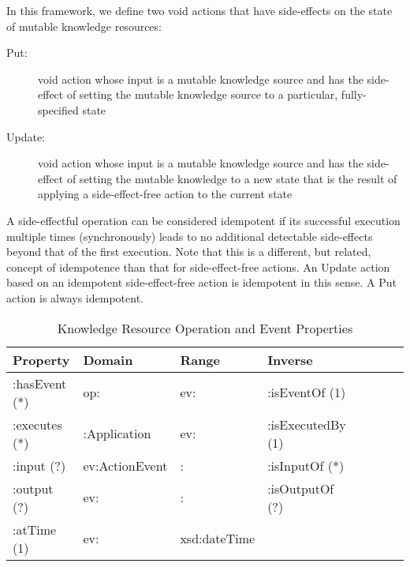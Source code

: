 \documentclass[runningheads]{llncs}
\begin{document}
In this framework, we define two void actions that have side-effects on the state of mutable knowledge resources:
  \begin{description}
    \item[Put:] void action whose input is a mutable knowledge source and has the side-effect of setting the mutable knowledge source to a particular, fully-specified state
    \item[Update:] void action whose input is a mutable knowledge source and has the side-effect of setting the mutable knowledge to a new state that is the result of applying a side-effect-free action to the current state
  \end{description}
  
  A side-effectful operation can be considered idempotent if its successful execution multiple times (synchronously) leads to no additional detectable side-effects beyond that of the first execution. Note that this is a different, but related, concept of idempotence than that for side-effect-free actions. An Update action based on an idempotent side-effect-free action is idempotent in this sense. A Put action is always idempotent.

\begin{table}[h]
\begin{tabular}{|l|l|l|l|l|l|l|l|}
\hline
\textbf{Property}  &\textbf{Domain}  & \textbf{Range}  & \textbf{Inverse}
\\ \hline
:hasEvent (*)      & op:               & ev:             & :isEventOf  (1)         \\ \hline
:executes (*)      & :Application      & ev:             & :isExecutedBy  (1)         \\ \hline
:input (?)         & ev:ActionEvent    &    :          & :isInputOf  (*)         \\ \hline
:output (?)        & ev:               &    :          & :isOutputOf  (?)         \\ \hline
:atTime (1)        & ev:               &    xsd:dateTime          &          \\ \hline
\end{tabular}
\caption{Knowledge Resource Operation and Event Properties}
\label{kropprop}
\end{table}
\end{document}
